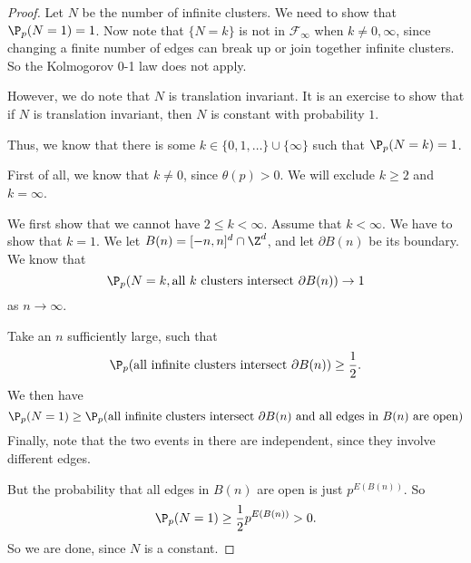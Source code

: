 \documentclass[a4paper]{article}
\begin{document}
\begin{proof}
  Let $N$ be the number of infinite clusters. We need to show that $\P_p(N = 1) = 1$. Now note that $\{N = k\}$ is not in $\mathcal{F}_\infty$ when $k \not= 0, \infty$, since changing a finite number of edges can break up or join together infinite clusters. So the Kolmogorov 0-1 law does not apply. 

  However, we do note that $N$ is translation invariant. It is an exercise to show that if $N$ is translation invariant, then $N$ is constant with probability $1$.

  Thus, we know that there is some $k \in \{0, 1, \ldots\} \cup \{\infty\}$ such that $\P_p(N = k) = 1$.

  First of all, we know that $k \not= 0$, since $\theta(p) > 0$. We will exclude $k \geq 2$ and $k = \infty$.

  We first show that we cannot have $2 \leq k < \infty$. Assume that $k < \infty$. We have to show that $k = 1$. We let $B(n) = [-n, n]^d \cap \Z^d$, and let $\partial B(n)$ be its boundary. We know that
  \[
    \P_p(N = k, \text{all $k$ clusters intersect $\partial B(n)$}) \to 1
  \]
  as $n \to \infty$.

  Take an $n$ sufficiently large, such that
  \[
    \P_p(\text{all infinite clusters intersect }\partial B(n)) \geq \frac{1}{2}.
  \]
  We then have
  \[
    \P_p(N = 1) \geq \P_p(\text{all infinite clusters intersect }\partial B(n)\text{ and all edges in $B(n)$ are open})
  \]
  Finally, note that the two events in there are independent, since they involve different edges.

  But the probability that all edges in $B(n)$ are open is just $p^{E(B(n))}$. So
  \[
    \P_p(N = 1) \geq \frac{1}{2} p^{E(B(n))} > 0.
  \]
  So we are done, since $N$ is a constant.

\end{proof}


\printindex
\end{document}

